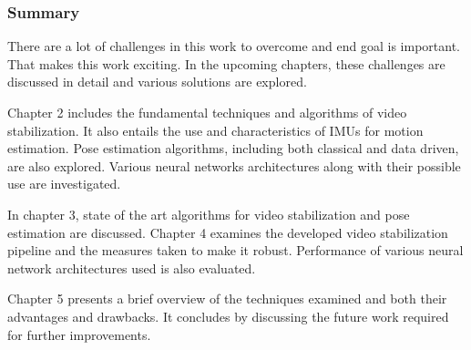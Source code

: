 \subsubsection{Summary}
There are a lot of challenges in this work to overcome and end goal is important. That makes this work exciting. In the upcoming chapters, these challenges are discussed in detail and various solutions are explored. 

Chapter 2 includes the fundamental techniques and algorithms of video stabilization. It also entails the use and characteristics of IMUs for motion estimation. Pose estimation algorithms, including both classical and data driven, are also explored. Various neural networks architectures along with their possible use are investigated.

In chapter 3, state of the art algorithms for video stabilization and pose estimation are discussed. Chapter 4 examines the developed video stabilization pipeline and the measures taken to make it robust. Performance of various neural network architectures used is also evaluated.

Chapter 5 presents a brief overview of the techniques examined and both their advantages and drawbacks. It concludes by discussing the future work required for further improvements.
